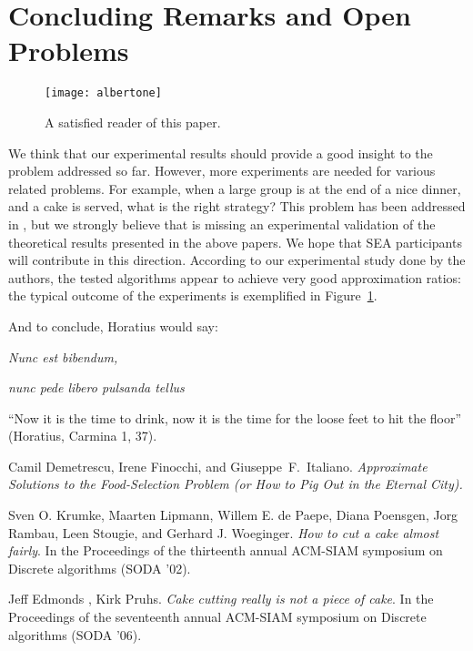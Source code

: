 \documentclass[twocolumn,10pt]{article}
\newcommand{\conference}{SEA\xspace}
\begin{document}
\section{Concluding Remarks and Open Problems}
\label{se: conclusions}

\begin{figure}[t!]
\begin{center}
\texttt{[image: albertone]}
\end{center}
\caption{A satisfied reader of this paper.}
\label{fi:albertone}
\end{figure}


We think that our experimental results should provide a good insight to
the problem addressed so far. However, more experiments are needed for
various related problems. For example, when a large group is at the end
of a nice dinner, and a cake is served, what is the right strategy? This
problem has been addressed in \cite{cake1,cake2}, but we strongly
believe that is missing an experimental validation of the theoretical results presented in the above papers. We hope that \conference participants will contribute in this direction. According to our experimental study done by the authors, 
the tested algorithms appear to achieve very good approximation ratios: the 
typical outcome of the experiments is exemplified in 
Figure~\ref{fi:albertone}. 



\noindent And to conclude, Horatius would say: \\

\vspace{2mm}

\centerline{{\em Nunc est bibendum,}}

\vspace{-2mm}

\begin{center}
{\em nunc pede libero pulsanda tellus}
\end{center}

\vspace{1mm}

\noindent ``Now it is the time to drink, now it is the time for the 
loose feet to hit the floor'' (Horatius, Carmina 1, 37).



\begin{thebibliography}{9}

Camil Demetrescu, Irene Finocchi, and Giuseppe~F.~Italiano. \emph{Approximate Solutions to the Food-Selection Problem (or How to Pig Out in the Eternal City).}

Sven O. Krumke, Maarten Lipmann, Willem E. de Paepe, Diana Poensgen, Jorg Rambau, Leen Stougie, and Gerhard J. Woeginger. \emph{How to cut a cake almost fairly}. In the Proceedings of the thirteenth annual ACM-SIAM symposium on Discrete algorithms (SODA '02).

Jeff Edmonds , Kirk Pruhs. \emph{Cake cutting really is not a piece of cake}. In the Proceedings of the seventeenth annual ACM-SIAM symposium on Discrete algorithms (SODA '06).

\end{thebibliography}
\newpage
\end{document}
